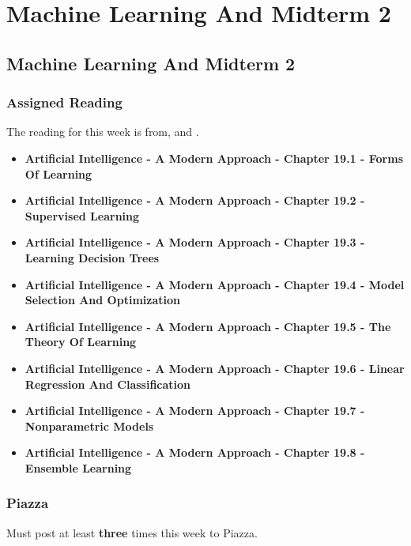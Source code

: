 \clearpage

\renewcommand{\ChapTitle}{Machine Learning And Midterm 2}
\renewcommand{\SectionTitle}{Machine Learning And Midterm 2}

\chapter{\ChapTitle}

\section{\SectionTitle}

\subsection{Assigned Reading}

The reading for this week is from, \AITextbook \hspace*{1pt} and \RLTextbook.

\begin{itemize}
    \item \textbf{Artificial Intelligence - A Modern Approach - Chapter 19.1 - Forms Of Learning}
    \item \textbf{Artificial Intelligence - A Modern Approach - Chapter 19.2 - Supervised Learning}
    \item \textbf{Artificial Intelligence - A Modern Approach - Chapter 19.3 - Learning Decision Trees}
    \item \textbf{Artificial Intelligence - A Modern Approach - Chapter 19.4 - Model Selection And Optimization}
    \item \textbf{Artificial Intelligence - A Modern Approach - Chapter 19.5 - The Theory Of Learning}
    \item \textbf{Artificial Intelligence - A Modern Approach - Chapter 19.6 - Linear Regression And Classification}
    \item \textbf{Artificial Intelligence - A Modern Approach - Chapter 19.7 - Nonparametric Models}
    \item \textbf{Artificial Intelligence - A Modern Approach - Chapter 19.8 - Ensemble Learning}
\end{itemize}

\subsection{Piazza}

Must post at least \textbf{three} times this week to Piazza.

